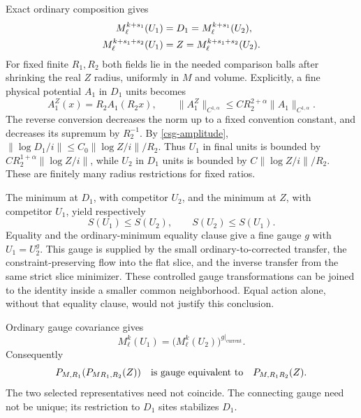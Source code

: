 Exact ordinary composition gives
\begin{align}
 M_\ell^{k+s_1}(U_1)&=D_1=M_\ell^{k+s_1}(U_2),\notag\\
 M_\ell^{k+s_1+s_2}(U_1)&=Z=M_\ell^{k+s_1+s_2}(U_2).
 \label{csg-feasibility}
\end{align}
For fixed finite $R_1,R_2$ both fields lie in the needed
comparison balls after shrinking the real $Z$ radius,
uniformly in $M$ and volume. Explicitly, a fine physical
potential $A_1$ in $D_1$ units becomes
\begin{equation}
 A_1^Z(x)=R_2A_1(R_2x),\qquad
 \|A_1^Z\|_{C^{1,\alpha}}
          \le C R_2^{2+\alpha}\|A_1\|_{C^{1,\alpha}}.
 \label{csg-rescaling}
\end{equation}
The reverse conversion decreases the norm up to a fixed
convention constant, and decreases its supremum by $R_2^{-1}$.
By \eqref{csg-amplitude}, $\|\log D_1/i\|\le C_0\|\log Z/i\|/R_2$.
Thus $U_1$ in final units is bounded by
$CR_2^{1+\alpha}\|\log Z/i\|$, while $U_2$ in $D_1$ units
is bounded by $C\|\log Z/i\|/R_2$. These are finitely many
radius restrictions for fixed ratios.

The minimum at $D_1$, with competitor $U_2$, and the minimum
at $Z$, with competitor $U_1$, yield respectively
\begin{equation}
 S(U_1)\le S(U_2),\qquad S(U_2)\le S(U_1).
 \label{csg-comparisons}
\end{equation}
Equality and the ordinary-minimum equality clause give a
fine gauge $g$ with $U_1=U_2^g$. This gauge is supplied by
the small ordinary-to-corrected transfer, the
constraint-preserving flow into the flat slice, and the
inverse transfer from the same strict slice minimizer.
These controlled gauge transformations can be joined to
the identity inside a smaller common neighborhood.
Equal action alone, without that equality clause, would
not justify this conclusion.

Ordinary gauge covariance gives
\begin{equation}
 M_\ell^k(U_1)=\bigl(M_\ell^k(U_2)\bigr)^{g|_{\mathrm{current}}}.
 \label{csg-gauge-covariance}
\end{equation}
Consequently
\begin{equation}
 P_{M,R_1}(P_{MR_1,R_2}(Z))
       \quad\hbox{is gauge equivalent to}\quad
 P_{M,R_1R_2}(Z).
 \label{csg-orbit-composition}
\end{equation}
The two selected representatives need not coincide. The
connecting gauge need not be unique; its restriction to
$D_1$ sites stabilizes $D_1$.

